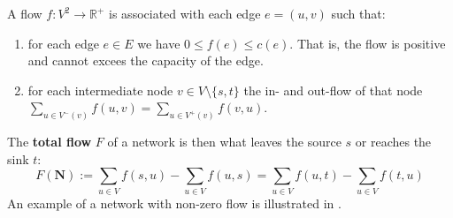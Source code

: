 \begin{definition}[Flow]
	A flow $f : V^2 \longrightarrow \mathbb{R}^{+}$ is associated with each edge $e = (u,v)$ such that:
	\begin{enumerate}
		\item for each edge $e \in E$ we have $0 \leq f(e) \leq c(e)$. That is, the flow is positive and cannot excees the capacity of the edge.
		
		\item for each intermediate node $v \in V\setminus \{s,t\}$ the in- and out-flow of that node $\sum_{u \in V^-(v)} f(u,v) = \sum_{u \in V^+(v)} f(v,u)$.
	\end{enumerate}
	The \textbf{total flow} $F$ of a network is then what leaves the source $s$ or reaches the sink $t$:
	\begin{equation}
	F(\textbf{N}) := \sum_{u \in V} f(s,u) - \sum_{u \in V}f(u,s) = \sum_{u \in V} f(u,t) - \sum_{u \in V}f(t,u)
	\end{equation}
	An example of a network with non-zero flow is illustrated in .
\end{definition}

